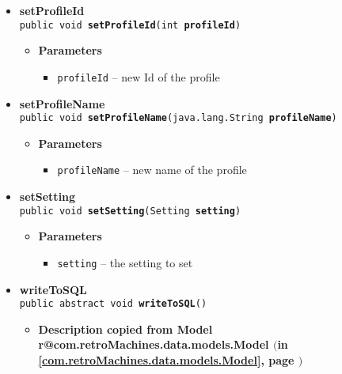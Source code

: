 \documentclass[11pt,a4paper]{report}
\makeatletter
\newcommand{\refdefined}[1]{
\expandafter\ifx\csname r@#1\endcsname\relax
\relax\else
{$($in \ref{#1}, page \pageref{#1}$)$}\fi}
\makeatother
\begin{document}
{{{{\begin{itemize}
{\begin{itemize}
{Checks if the database has a possibly previous copy for the model
}
\item{{\bf  Returns} -- 
true if a records exists; false otherwise 
}%
\end{itemize}
}%
\item{ 
{\bf  setProfileId}\\
\texttt{public void\ {\bf  setProfileId}(\texttt{int} {\bf  profileId})
\label{com.retroMachines.data.models.Profile.setProfileId(int)}}%
\begin{itemize}
\item{
{\bf  Parameters}
  \begin{itemize}
   \item{
\texttt{profileId} -- new Id of the profile}
  \end{itemize}
}%
\end{itemize}
}%
\item{ 
{\bf  setProfileName}\\
\texttt{public void\ {\bf  setProfileName}(\texttt{java.lang.String} {\bf  profileName})
\label{com.retroMachines.data.models.Profile.setProfileName(java.lang.String)}}%
\begin{itemize}
\item{
{\bf  Parameters}
  \begin{itemize}
   \item{
\texttt{profileName} -- new name of the profile}
  \end{itemize}
}%
\end{itemize}
}%
\item{ 
{\bf  setSetting}\\
\texttt{public void\ {\bf  setSetting}(\texttt{Setting} {\bf  setting})
\label{com.retroMachines.data.models.Profile.setSetting(com.retroMachines.data.models.Setting)}}%
\begin{itemize}
\item{
{\bf  Parameters}
  \begin{itemize}
   \item{
\texttt{setting} -- the setting to set}
  \end{itemize}
}%
\end{itemize}
}%
\item{ 
{\bf  writeToSQL}\\
\texttt{public abstract void\ {\bf  writeToSQL}()
\label{com.retroMachines.data.models.Profile.writeToSQL()}}%
\begin{itemize}
\item{
{\bf  Description copied from Model{\small \refdefined{com.retroMachines.data.models.Model}} }

}
\end{itemize}}
\end{itemize}}}}}
\end{document}
